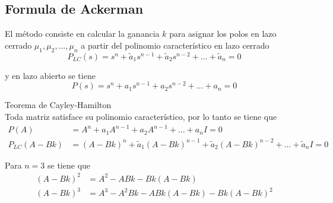 \subsection{Formula de Ackerman}

El método consiste en calcular la ganancia \( k \) para asignar los polos en lazo cerrado \( \mu_{1}, \mu_{2}, \ldots, \mu_{n} \) a partir del polinomio característico en lazo cerrado
\[
    P_{LC}(s) = s^{n} + \tilde{a}_{1}s^{n-1} + \tilde{a}_{2}s^{n-2} + \ldots + \tilde{a}_{n} = 0 
\]

y en lazo abierto se tiene
\[
    P(s) = s^{n} + a_{1}s^{n-1} + a_{2}s^{n-2} + \ldots + a_{n} = 0
\]

Teorema de Cayley-Hamilton \\
Toda matriz satisface su polinomio característico, por lo tanto se tiene que
\[
    \begin{split}
        P(A) & = A^{n} + a_{1}A^{n-1} + a_{2}A^{n-1} + \ldots + a_{n}I = 0 \\
        P_{LC}(A-Bk) & = (A-Bk)^{n} + \tilde{a}_{1}(A-Bk)^{n-1} + \tilde{a}_{2}(A-Bk)^{n-2} + \ldots + \tilde{a}_{n}I = 0
    \end{split}
\]

Para \( n=3 \) se tiene que 
\[
    \begin{split}
        (A-Bk)^{2} & = A^{2} - ABk - Bk(A-Bk) \\
        (A-Bk)^{3} & = A^{3} - A^{2}Bk - ABk(A-Bk) -Bk(A-Bk)^{2}
    \end{split}
\]

